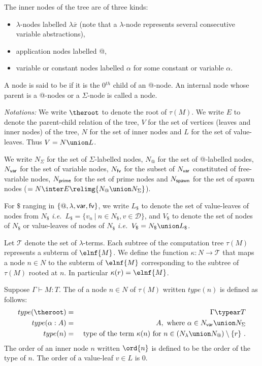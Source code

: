 The inner nodes of the tree are of three kinds:
\begin{itemize}
\item $\lambda$-nodes labelled $\lambda \overline{x}$ (note that a $\lambda$-node represents several consecutive variable abstractions),
\item application nodes labelled @,
\item variable or constant nodes labelled $\alpha$ for some constant or variable $\alpha$.
\end{itemize}
A node is said to be  if it is the 0$^{th}$ child of an @-node.
An internal node whose parent is a @-nodes or a $\Sigma$-node is called a  node.
\bigskip

\emph{Notations:} We write $\theroot$ to denote the root of
$\tau(M)$. We write $E$ to denote the parent-child relation of the
tree, $V$ for the set of vertices (leaves and inner nodes) of the
tree, $N$ for the set of inner nodes and $L$ for the set of
value-leaves. Thus $V = N \union L$.

We write $N_\Sigma$ for the set of $\Sigma$-labelled nodes, $N_@$ for the set
of @-labelled nodes, $N_{\sf var}$ for the set of variable nodes,
$N_{\sf fv}$ for the subset of $N_{\sf var}$ constituted of free-variable nodes, $N_{\sf prime}$ for the set of prime nodes
and $N_{\sf spawn}$ for the set of spawn nodes ($= N \inter E \relimg{N_@ \union N_\Sigma}$).

For $\$$ ranging in $\{@, \lambda, {\sf var}, {\sf fv} \}$,
we write $L_\$$ to denote the set of value-leaves of nodes from $N_\$$
{\it i.e.}\ $L_\$ = \{ v_n \ | \ n \in N_\$, v \in \mathcal{D} \}$,
and $V_\$$ to denote the set of nodes of $N_\$$ or value-leaves of nodes of $N_\$$
{\it i.e.}\ $V_\$ = N_\$ \union L_\$ $.


Let $\mathcal{T}$ denote the set of $\lambda$-terms.
Each subtree of the computation tree $\tau(M)$ represents a subterm of $\elnf{M}$.
We define the function $\kappa : N \rightarrow \mathcal{T}$ that maps a node $n \in N$ to the subterm of $\elnf{M}$
corresponding to the subtree of $\tau(M)$ rooted at $n$.
In particular $\kappa(r) = \elnf{M}$.

\begin{definition}
\label{def:nodeorder}
Suppose $\Gamma \vdash M : T$.
The  of a node $n \in N$ of $\tau(M)$ written $type(n)$ is defined as follows:
\begin{eqnarray*}
type(\theroot) &=& \Gamma \typear T \\
type(\alpha:A) &=& A, \mbox{ where $\alpha \in N_{\sf var} \union N_\Sigma$} \\
type(n) &=& \hbox{ type of the term $\kappa(n)$ for $n \in (N_\lambda \union N_@) \setminus \{r \}$\ .}
\end{eqnarray*}
The order of an inner node $n$ written $\ord{n}$ is defined to be
the order of the type of $n$. The order of a value-leaf $v \in L$ is
$0$.
\end{definition}


